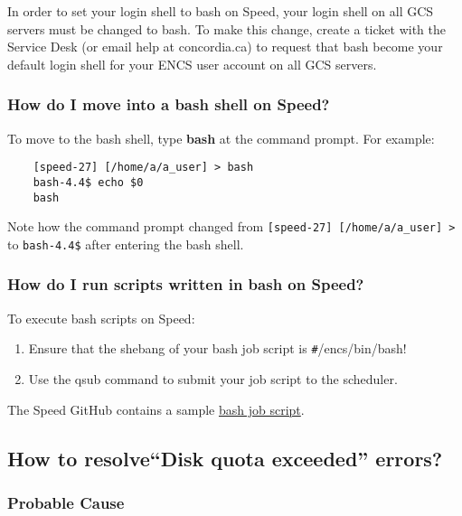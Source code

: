 \documentclass{easychair}
\begin{document}
In order to set your login shell to bash on Speed, your login shell on all GCS servers must be changed to bash.
To make this change, create a ticket with the Service Desk (or email help at concordia.ca) to request that bash become your default login shell for your ENCS user account on all GCS servers.

\subsubsection{How do I move into a bash shell on Speed?}

To move to the bash shell, type \textbf{bash} at the command prompt.
For example:
\begin{verbatim}
	[speed-27] [/home/a/a_user] > bash
	bash-4.4$ echo $0
	bash
\end{verbatim}	

Note how the command prompt changed from \verb![speed-27] [/home/a/a_user] >! to \verb!bash-4.4$! after entering the bash shell.

\subsubsection{How do I run scripts written in bash on Speed?}

To execute bash scripts on Speed:
\begin{enumerate}
	\item 
Ensure that the shebang of your bash job script is \verb!#!/encs/bin/bash!
	\item 
Use the qsub command to submit your job script to the scheduler.
\end{enumerate}

The Speed GitHub contains a sample \href{https://github.com/NAG-DevOps/speed-hpc/blob/master/src/bash.sh}{bash job script}.  

\subsection{How to resolve``Disk quota exceeded'' errors?}

\subsubsection{Probable Cause}
\end{document}
